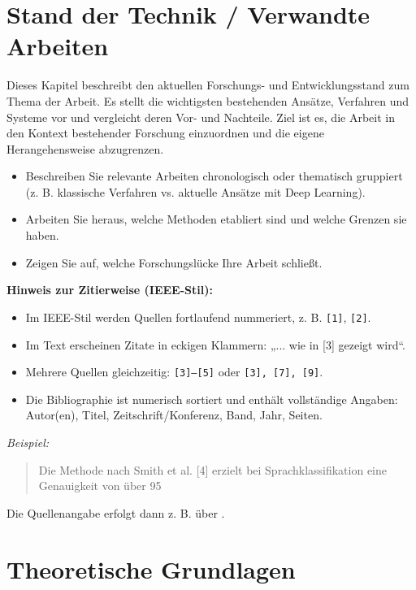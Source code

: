 \chapter{Stand der Technik / Verwandte Arbeiten}


Dieses Kapitel beschreibt den aktuellen Forschungs- und Entwicklungsstand zum Thema der Arbeit. Es stellt die wichtigsten bestehenden Ansätze, Verfahren und Systeme vor und vergleicht deren Vor- und Nachteile. Ziel ist es, die Arbeit in den Kontext bestehender Forschung einzuordnen und die eigene Herangehensweise abzugrenzen.

\begin{itemize}
\item Beschreiben Sie relevante Arbeiten chronologisch oder thematisch gruppiert (z. B. klassische Verfahren vs. aktuelle Ansätze mit Deep Learning).
\item Arbeiten Sie heraus, welche Methoden etabliert sind und welche Grenzen sie haben.
\item Zeigen Sie auf, welche Forschungslücke Ihre Arbeit schließt.
\end{itemize}

\textbf{Hinweis zur Zitierweise (IEEE-Stil):}
\begin{itemize}
\item Im IEEE-Stil werden Quellen fortlaufend nummeriert, z. B. \texttt{[1]}, \texttt{[2]}.
\item Im Text erscheinen Zitate in eckigen Klammern: „... wie in [3] gezeigt wird“.
\item Mehrere Quellen gleichzeitig: \texttt{[3]--[5]} oder \texttt{[3], [7], [9]}.
\item Die Bibliographie ist numerisch sortiert und enthält vollständige Angaben: Autor(en), Titel, Zeitschrift/Konferenz, Band, Jahr, Seiten.
\end{itemize}

\textit{Beispiel:}
\begin{quote}
Die Methode nach Smith et al. [4] erzielt bei Sprachklassifikation eine Genauigkeit von über 95%
\end{quote}


Die Quellenangabe erfolgt dann z. B. über \texttt{\cite{knuth1984texbook}}.




\chapter{Theoretische Grundlagen}\label{ch:theorie}

